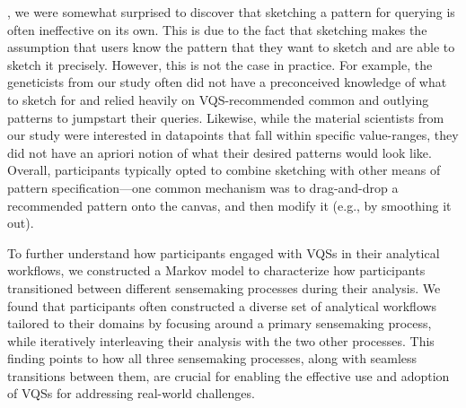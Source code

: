  \par {}, we were somewhat surprised to discover that sketching a pattern for querying is often ineffective on its own. This is due to the fact that sketching makes the assumption that users know the pattern that they want to sketch and are able to sketch it precisely. However, this is  not the case in practice. For example, the geneticists from our study often did not have a preconceived knowledge of what to sketch for and relied heavily on VQS-recommended common and outlying patterns to jumpstart their queries. Likewise, while the material scientists from our study were interested in datapoints that fall within specific value-ranges, they did not have an apriori notion of what their desired patterns would look like. Overall, participants typically opted to combine sketching with other means of pattern specification---one common mechanism was to drag-and-drop a recommended pattern onto the canvas, and then modify it (e.g., by smoothing it out). %
 \par To further understand how participants engaged with VQSs in their analytical workflows, we constructed a Markov model to characterize how participants transitioned between different sensemaking processes during their analysis. We found that participants often constructed a diverse set of analytical workflows tailored to their domains by focusing around a primary sensemaking process, while iteratively interleaving their analysis with the two other processes. This finding points to how all three sensemaking processes, along with seamless transitions between them, are crucial for enabling the effective use and adoption of VQSs for addressing real-world challenges.%

